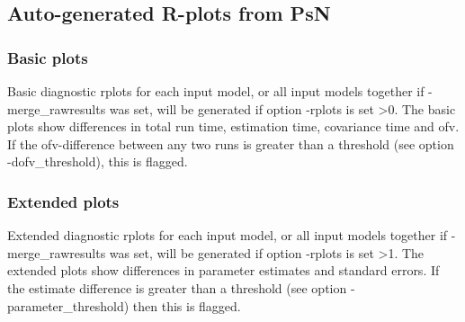 \subsection{Auto-generated R-plots from PsN}
\newcommand{\rplotsconditions}{The default benchmark template 
requires no special R libraries.
If no pdf is generated,
see the .Rout file in the main run directory for error messages.}


\subsubsection*{Basic plots}
Basic diagnostic rplots for each input model, or all input models together if -merge\_rawresults was set, 
will be generated if option -rplots is set >0.
The basic plots show differences in total run time, estimation time, covariance time and ofv.
If the ofv-difference between any two runs is greater than a threshold (see option -dofv\_threshold), this is flagged. 

\subsubsection*{Extended plots}
Extended diagnostic rplots for each input model, or all input models together if -merge\_rawresults was set, 
will be generated if option -rplots is set >1.
The extended plots show differences in parameter estimates and standard errors.
If the estimate difference is greater than a threshold (see option -parameter\_threshold) then this is flagged.
